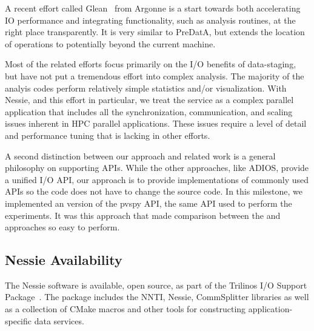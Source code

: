 A recent effort called Glean~\cite{vishwanath:2011:glean} from Argonne is a
start towards both accelerating IO performance and integrating functionality,
such as analysis routines, at the right place transparently. It is very similar
to PreDatA, but extends the location of operations to potentially beyond the
current machine.

Most of the related efforts focus primarily on the I/O benefits of data-staging, but
have not put a tremendous effort into complex analysis. The majority of the analyis
codes perform relatively simple statistics and/or visualization.  With Nessie, and 
this effort in particular, we treat the service as a complex parallel application
that includes all the synchronization, communication, and scaling issues inherent in HPC 
parallel applications.  These issues require a level of detail and performance 
tuning that is lacking in other efforts.  

A second distinction between our approach and related work is a general 
philosophy on supporting APIs.  While the other approaches, like ADIOS,
provide a unified I/O API, our approach is to provide \intransit
implementations of commonly used APIs so the code does not have to change the
source code.  In this milestone, we implemented an \intransit version of
the pvspy API, the same API used to perform the \insitu experiments.  It was
this approach that made comparison between the \insitu and \intransit
approaches so easy to perform.

\subsection{Nessie Availability}

The Nessie software is available, open source, as part
of the Trilinos I/O Support Package~\cite{oldfield:2012:trios-journal}.
The package includes the NNTI, Nessie, CommSplitter libraries as well
as a collection of CMake macros and other tools for constructing 
application-specific data services.


